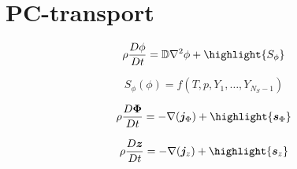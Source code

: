 \documentclass[20pt,twocolumn]{article}
\begin{document}

\vspace{10mm}

\setlength{\parindent}{0cm}

\renewcommand{\familydefault}{\sfdefault}

\LARGE

\section{PC-transport}

\begin{equation*}
\rho \frac{D \phi}{Dt} = \mathbb{D} \nabla^2 \phi + \highlight{S_{\phi}}
\end{equation*}

\begin{equation*}
S_{\phi}(\phi) = f(T, p, Y_1, \dots, Y_{N_S - 1})
\end{equation*}

\begin{equation*}
\rho \frac{D \bm{\Phi}}{Dt} = - \nabla (\bm{j}_{\Phi}) + \highlight{\bm{s}_{\Phi}}
\end{equation*}

\begin{equation*}
\rho \frac{D \bm{z}}{Dt} = - \nabla (\bm{j}_{z}) + \highlight{\bm{s}_{z}}
\end{equation*}
\end{document}
